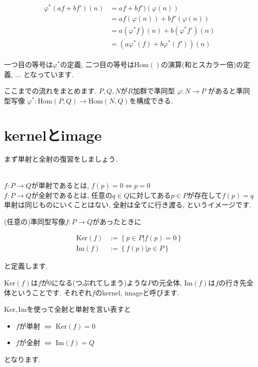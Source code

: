 \documentclass{jsarticle}
\def\Im{\mathrm{Im}}
\def\Ker{\mathrm{Ker}}
\def\Hom{\mathrm{Hom}}
\theoremstyle{definition}
\numberwithin{theorem}{section}
\begin{document}
\begin{eqnarray*}
\begin{aligned}
\varphi^*(af+bf')(n) &= af+bf')(\varphi(n))\\
&= af(\varphi(n)) + bf'(\varphi(n))\\
&= a(\varphi^*f)(n)+b(\varphi^*f')(n)\\
&= (a\varphi^*(f)+b\varphi^*(f'))(n)
\end{aligned}
\end{eqnarray*}

一つ目の等号は$\varphi^*$の定義, 二つ目の等号は$\Hom()$の演算(和とスカラー倍)の定義, ... となっています.

ここまでの流れをまとめます. $P, Q, N$が$R$加群で準同型 $\varphi: N \rightarrow P$ があると準同型写像
$\varphi^*: \Hom(P, Q) \rightarrow \Hom(N, Q)$を構成できる. 

\newpage
\section{kernelとimage}
まず単射と全射の復習をしましょう.

\hrulefill\\

$f: P \rightarrow Q$が単射であるとは, $f(p) = 0\Leftrightarrow p = 0$\\
$f: P \rightarrow Q$が全射であるとは, 任意の$q\in Q$に対してある$p\in P$が存在して$f(p) = q$\\

単射は同じものにいくことはない, 全射は全てに行き渡る, というイメージです.

(任意の)準同型写像$f: P \rightarrow Q$があったときに

\begin{eqnarray*}
\Ker(f) &:= \left\{p \in P | f(p) = 0\right\}\\
\Im(f) &:= \left\{f(p) | p\in P\right\}
\end{eqnarray*}

と定義します.

$\Ker(f)$は$f$が0になる(つぶれてしまう)ような$P$の元全体, $\Im(f)$は$f$の行き先全体ということです. それぞれ$f$のkernel, imageと呼びます.

$\Ker, \Im$を使って全射と単射を言い表すと
\begin{itemize}
\item $f$が単射 $\Leftrightarrow$ $\Ker(f) = 0$
\item $f$が全射 $\Leftrightarrow$ $\Im(f) = Q$
\end{itemize}
となります.
\end{document}
